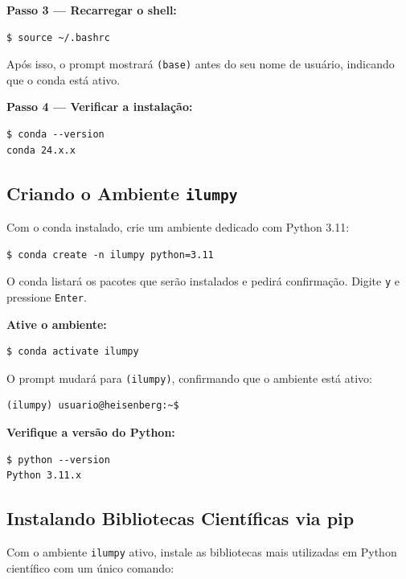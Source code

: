 \documentclass[11pt, a4paper]{article}
\begin{document}
\textbf{Passo 3 — Recarregar o shell:}

\begin{lstlisting}[style=terminal]
$ source ~/.bashrc
\end{lstlisting}

Após isso, o prompt mostrará \texttt{(base)} antes do seu nome de usuário,
indicando que o conda está ativo.

\textbf{Passo 4 — Verificar a instalação:}

\begin{lstlisting}[style=terminal]
$ conda --version
conda 24.x.x
\end{lstlisting}

\subsection{Criando o Ambiente \texttt{ilumpy}}

Com o conda instalado, crie um ambiente dedicado com Python 3.11:

\begin{lstlisting}[style=terminal]
$ conda create -n ilumpy python=3.11
\end{lstlisting}

O conda listará os pacotes que serão instalados e pedirá confirmação.
Digite \texttt{y} e pressione \texttt{Enter}.

\textbf{Ative o ambiente:}

\begin{lstlisting}[style=terminal]
$ conda activate ilumpy
\end{lstlisting}

O prompt mudará para \texttt{(ilumpy)}, confirmando que o ambiente está ativo:

\begin{lstlisting}[style=terminal]
(ilumpy) usuario@heisenberg:~$
\end{lstlisting}

\textbf{Verifique a versão do Python:}

\begin{lstlisting}[style=terminal]
$ python --version
Python 3.11.x
\end{lstlisting}

\subsection{Instalando Bibliotecas Científicas via pip}

Com o ambiente \texttt{ilumpy} ativo, instale as bibliotecas mais utilizadas
em Python científico com um único comando:
\end{document}
